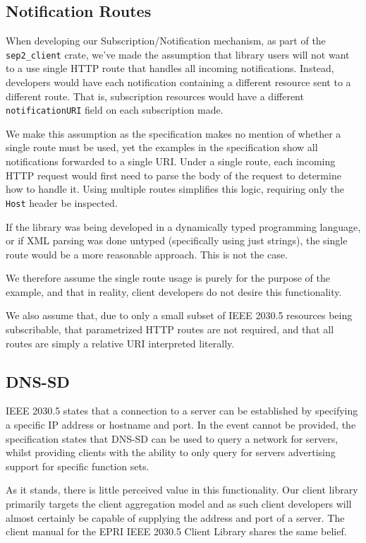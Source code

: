 \subsection{Notification Routes}
When developing our Subscription/Notification mechanism, as part of the \texttt{sep2\_client} crate, we've made the assumption that library users will not want to a use single HTTP route that handles all incoming notifications. Instead, developers would have each notification containing a different resource sent to a different route. That is, subscription resources would have a different \texttt{notificationURI} field on each subscription made.

We make this assumption as the specification makes no mention of whether a single route must be used, yet the examples in the specification show all notifications forwarded to a single URI. Under a single route, each incoming HTTP request would first need to parse the body of the request to determine how to handle it. Using multiple routes simplifies this logic, requiring only the \texttt{Host} header be inspected. 

If the library was being developed in a dynamically typed programming language, or if XML parsing was done untyped (specifically using just strings), the single route would be a more reasonable approach. This is not the case.

We therefore assume the single route usage is purely for the purpose of the example, and that in reality, client developers do not desire this functionality.

We also assume that, due to only a small subset of IEEE 2030.5 resources being subscribable, that parametrized HTTP routes are not required, and that all routes are simply a relative URI interpreted literally.

\subsection{DNS-SD}
IEEE 2030.5 states that a connection to a server can be established by specifying a specific IP address or hostname and port. In the event cannot be provided, the specification states that DNS-SD can be used to query a network for servers, whilst providing clients with the ability to only query for servers advertising support for specific function sets. 

As it stands, there is little perceived value in this functionality. Our client library primarily targets the client aggregation model and as such client developers will almost certainly be capable of supplying the address and port of a server.
The client manual for the EPRI IEEE 2030.5 Client Library shares the same belief. \cite{eprimanual}

